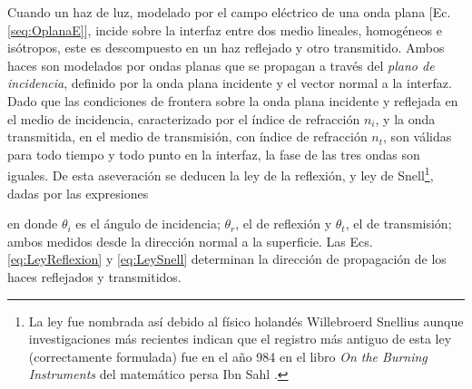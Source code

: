 Cuando un haz de luz, modelado por el campo eléctrico de una onda plana [Ec. \eqref{seq:OplanaE}], incide sobre la interfaz entre dos medio lineales, homogéneos e isótropos, este es descompuesto en un haz reflejado y otro transmitido. Ambos haces son modelados por ondas planas que se propagan a través del \emph{plano de incidencia}, definido por la onda plana incidente y el vector normal a la interfaz. Dado que las condiciones de frontera sobre la onda plana incidente y reflejada en el medio de incidencia, caracterizado por el índice de refracción $n_i$, y la onda transmitida, en el medio de transmisión, con índice de refracción $n_t$, son válidas para todo tiempo y todo punto en la interfaz, la fase de las tres ondas son iguales. De esta aseveración se deducen la ley de la reflexión, y ley de Snell\footnote{La ley fue nombrada así debido al físico holandés Willebroerd Snellius aunque investigaciones más recientes indican que el registro más antiguo de esta ley (correctamente formulada) fue en el año 984 en el libro \emph{On the Burning Instruments} del matemático persa Ibn Sahl \cite{kwan2002really}.}, dadas por las expresiones  
	\begin{tcolorbox}[title = Ley de la reflexión y ley de Snell ]
	\end{tcolorbox}	 \vspace*{-1em}\noindent
en donde $\theta_i$ es el ángulo de incidencia; $\theta_r$, el de reflexión y $\theta_t$, el de transmisión; ambos medidos desde la dirección normal a la superficie. Las Ecs. \eqref{eq:LeyReflexion} y \eqref{eq:LeySnell} determinan la dirección de propagación de los haces reflejados y transmitidos.


